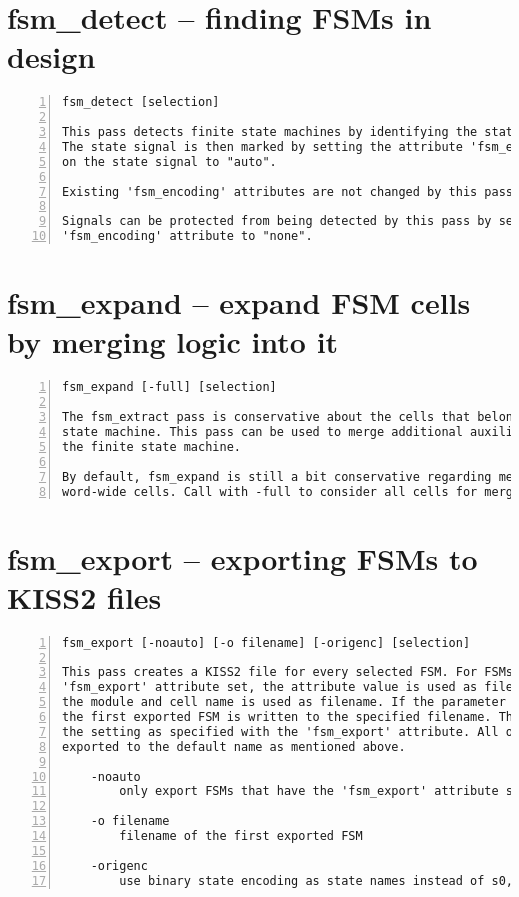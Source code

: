 \section{fsm\_detect -- finding FSMs in design}
\label{cmd:fsm_detect}
\begin{lstlisting}[numbers=left,frame=single]
    fsm_detect [selection]

This pass detects finite state machines by identifying the state signal.
The state signal is then marked by setting the attribute 'fsm_encoding'
on the state signal to "auto".

Existing 'fsm_encoding' attributes are not changed by this pass.

Signals can be protected from being detected by this pass by setting the
'fsm_encoding' attribute to "none".
\end{lstlisting}

\section{fsm\_expand -- expand FSM cells by merging logic into it}
\label{cmd:fsm_expand}
\begin{lstlisting}[numbers=left,frame=single]
    fsm_expand [-full] [selection]

The fsm_extract pass is conservative about the cells that belong to a finite
state machine. This pass can be used to merge additional auxiliary gates into
the finite state machine.

By default, fsm_expand is still a bit conservative regarding merging larger
word-wide cells. Call with -full to consider all cells for merging.
\end{lstlisting}

\section{fsm\_export -- exporting FSMs to KISS2 files}
\label{cmd:fsm_export}
\begin{lstlisting}[numbers=left,frame=single]
    fsm_export [-noauto] [-o filename] [-origenc] [selection]

This pass creates a KISS2 file for every selected FSM. For FSMs with the
'fsm_export' attribute set, the attribute value is used as filename, otherwise
the module and cell name is used as filename. If the parameter '-o' is given,
the first exported FSM is written to the specified filename. This overwrites
the setting as specified with the 'fsm_export' attribute. All other FSMs are
exported to the default name as mentioned above.

    -noauto
        only export FSMs that have the 'fsm_export' attribute set

    -o filename
        filename of the first exported FSM

    -origenc
        use binary state encoding as state names instead of s0, s1, ...
\end{lstlisting}

